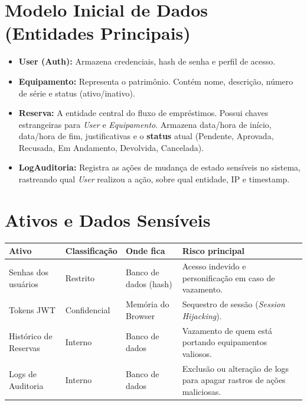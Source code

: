 \documentclass[12pt,a4paper]{article}
\begin{document}
\section*{Modelo Inicial de Dados (Entidades Principais)}

\begin{itemize}
    \item \textbf{User (Auth):} Armazena credenciais, hash de senha e perfil de acesso.
    \item \textbf{Equipamento:} Representa o patrimônio. Contém nome, descrição, número de série e status (ativo/inativo).
    \item \textbf{Reserva:} A entidade central do fluxo de empréstimos. Possui chaves estrangeiras para \textit{User} e \textit{Equipamento}. Armazena data/hora de início, data/hora de fim, justificativas e o \textbf{status} atual (Pendente, Aprovada, Recusada, Em Andamento, Devolvida, Cancelada).
    \item \textbf{LogAuditoria:} Registra as ações de mudança de estado sensíveis no sistema, rastreando qual \textit{User} realizou a ação, sobre qual entidade, IP e timestamp.
\end{itemize}

\section*{Ativos e Dados Sensíveis}

\begin{tabular}{@{}p{3cm}p{2.5cm}p{3cm}p{5.5cm}@{}}
\toprule
\textbf{Ativo} & \textbf{Classificação} & \textbf{Onde fica} & \textbf{Risco principal} \\
\midrule
Senhas dos usuários & Restrito & Banco de dados (hash) & Acesso indevido e personificação em caso de vazamento. \\
Tokens JWT & Confidencial & Memória do Browser & Sequestro de sessão (\textit{Session Hijacking}). \\
Histórico de Reservas & Interno & Banco de dados & Vazamento de quem está portando equipamentos valiosos. \\
Logs de Auditoria & Interno & Banco de dados & Exclusão ou alteração de logs para apagar rastros de ações maliciosas. \\
\bottomrule
\end{tabular}
\end{document}
